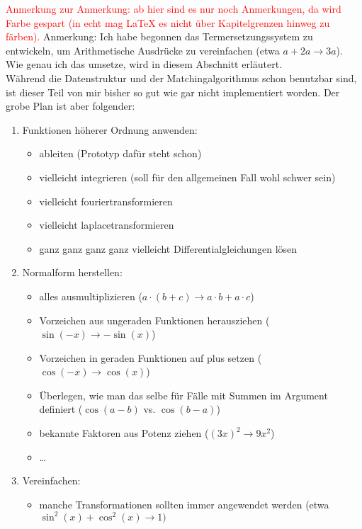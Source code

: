 \documentclass{scrartcl}
\numberwithin{figure}{section} %
\theoremstyle{definition} %
\begin{document}
\begin{itshape}
\textcolor{red} {Anmerkung zur Anmerkung: ab hier sind es nur noch Anmerkungen, da wird Farbe gespart (in echt mag \LaTeX{}  es nicht über Kapitelgrenzen hinweg zu färben).}
Anmerkung: Ich habe begonnen das Termersetzungssystem zu entwickeln, um Arithmetische Ausdrücke zu vereinfachen (etwa $a + 2 a \rightarrow 3 a$). Wie genau ich das umsetze, wird in diesem Abschnitt erläutert.
\\Während die Datenstruktur und der Matchingalgorithmus schon benutzbar sind, ist dieser Teil von mir bisher so gut wie gar nicht implementiert worden. Der grobe Plan ist aber folgender:
\begin{enumerate}
    \item Funktionen höherer Ordnung anwenden:
    \begin{itemize}
        \item ableiten (Prototyp dafür steht schon)
        \item vielleicht integrieren (soll für den allgemeinen Fall wohl schwer sein)
        \item vielleicht fouriertransformieren
        \item vielleicht laplacetransformieren
        \item ganz ganz ganz ganz vielleicht Differentialgleichungen lösen
    \end{itemize}
    \item Normalform herstellen:
    \begin{itemize}
        \item alles ausmultiplizieren ($a\cdot (b + c) \rightarrow a\cdot b + a\cdot c$)
        \item Vorzeichen aus ungeraden Funktionen herausziehen ($\sin(-x) \rightarrow -\sin(x)$)
        \item Vorzeichen in geraden Funktionen auf plus setzen ($\cos(-x) \rightarrow \cos(x)$)
        \item Überlegen, wie man das selbe für Fälle mit Summen im Argument definiert ($\cos(a - b)$ vs. $\cos(b - a)$)
        \item bekannte Faktoren aus Potenz ziehen ($(3 x)^2 \rightarrow 9 x^2$)
        \item \dots
    \end{itemize}
    \item Vereinfachen:
    \begin{itemize}
        \item manche Transformationen sollten immer angewendet werden (etwa $\sin^2(x) + \cos^2(x) \rightarrow 1)$

\end{itemize}
\end{enumerate}
\end{itshape}
\end{document}
